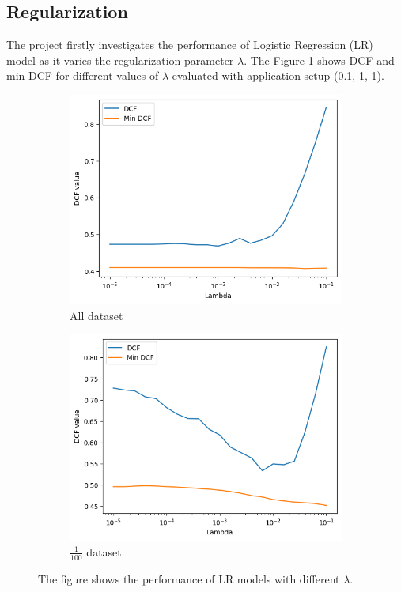 \documentclass{article}
\begin{document}
\subsection{Regularization}
The project firstly investigates the performance of Logistic Regression (LR) model as it varies the regularization parameter $\lambda$. The Figure \ref{fig:lr_lambda} shows DCF and min DCF for different values of $\lambda$ evaluated with application setup (0.1, 1, 1).

\begin{figure}[ht]
    \centering
    \begin{subfigure}[b]{0.45\textwidth}
        \centering
        \includegraphics[width=\textwidth]{images/lr_lambda.png}
        \caption{All dataset}
        \label{fig:lr_lambda}
    \end{subfigure}
    \hfill
    \begin{subfigure}[b]{0.45\textwidth}
        \centering
        \includegraphics[width=\textwidth]{images/lr_lambda_100.png}
        \caption{$\frac{1}{100}$ dataset}
        \label{fig:lr_lambda_100}
    \end{subfigure}
    \caption{The figure shows the performance of LR models with different $\lambda$.}
\end{figure}
\end{document}
